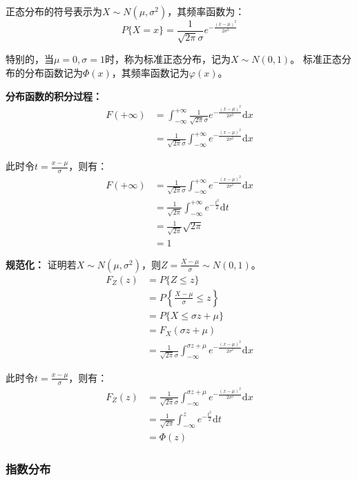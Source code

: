 \documentclass[a4paper,12pt]{ctexart}
\begin{document}
正态分布的符号表示为$X\sim N(\mu,\sigma^2)$，其频率函数为：
\begin{equation*}
	P\{X = x\} = \frac{1}{\sqrt{2\pi}\sigma}e^{-\frac{(x-\mu)^2}{2\sigma^2}}
\end{equation*}

特别的，当$\mu = 0,\sigma = 1$时，称为标准正态分布，记为$X\sim N(0,1)$。
标准正态分布的分布函数记为$\Phi(x)$，其频率函数记为$\varphi(x)$。

\textbf{分布函数的积分过程：}
\begin{align*}
	F(+\infty) &= \int_{-\infty}^{+\infty}\frac{1}{\sqrt{2\pi}\sigma}e^{-\frac{(x-\mu)^2}{2\sigma^2}}\mathrm{d}x \\
	&= \frac{1}{\sqrt{2\pi}\sigma} \int_{-\infty}^{+\infty}e^{-\frac{(x-\mu)^2}{2\sigma^2}}\mathrm{d}x
\end{align*}

此时令$t = \frac{x-\mu}{\sigma}$，则有：
\begin{align*}
	F(+\infty) &= \frac{1}{\sqrt{2\pi}\sigma} \int_{-\infty}^{+\infty}e^{-\frac{(x-\mu)^2}{2\sigma^2}}\mathrm{d}x \\
	&= \frac{1}{\sqrt{2\pi}} \int_{-\infty}^{+\infty}e^{-\frac{t^2}{2}}\mathrm{d}t \\
	&= \frac{1}{\sqrt{2\pi}} \sqrt{2\pi} \\
	&= 1
\end{align*}

\textbf{规范化：}
证明若$X \sim N(\mu,\sigma^2)$，则$Z = \frac{X-\mu}{\sigma} \sim N(0,1)$。
\begin{align*}
	F_Z(z) &= P\{Z \leq z\} \\
	&= P\left\{\frac{X-\mu}{\sigma} \leq z\right\} \\
	&= P\{X \leq \sigma z + \mu\} \\
	&= F_X(\sigma z + \mu) \\
	&= \frac{1}{\sqrt{2\pi}\sigma} \int_{-\infty}^{\sigma z + \mu}e^{-\frac{(x-\mu)^2}{2\sigma^2}}\mathrm{d}x
\end{align*}

此时令$t = \frac{x-\mu}{\sigma}$，则有：
\begin{align*}
	F_Z(z) &= \frac{1}{\sqrt{2\pi}\sigma} \int_{-\infty}^{\sigma z + \mu}e^{-\frac{(x-\mu)^2}{2\sigma^2}}\mathrm{d}x \\
	&= \frac{1}{\sqrt{2\pi}} \int_{-\infty}^z e^{-\frac{t^2}{2}}\mathrm{d}t \\
	&= \Phi(z)
\end{align*}

\subsubsection{指数分布}
\end{document}
